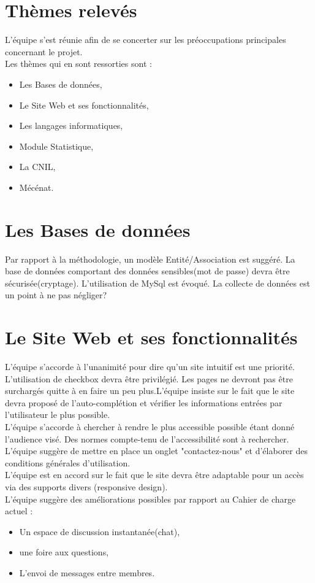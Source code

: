 \documentclass [a4paper] {article}
\begin{document}
\section{Thèmes relevés}
L'équipe s'est réunie afin de se concerter sur les préoccupations principales concernant le projet.
\\
Les thèmes qui en sont ressorties sont : 
\begin{itemize}
\item Les Bases de données,
\item Le Site Web et ses fonctionnalités,
\item Les langages informatiques,
\item Module Statistique,
\item La CNIL,
\item Mécénat.
\end{itemize}


\section{Les Bases de données}
Par rapport à la méthodologie, un modèle Entité/Association est suggéré.
La base de données comportant des données sensibles(mot de passe) devra être sécurisée(cryptage). L'utilisation de MySql est évoqué. La collecte de données est un point à ne pas négliger?


\section{Le Site Web et ses fonctionnalités}

L'équipe s'accorde à l'unanimité pour dire qu'un site intuitif est une priorité. L'utilisation de checkbox devra être privilégié. Les pages ne devront pas être surchargés quitte à en faire un peu plus.L'équipe insiste sur le fait que le site devra proposé de l'auto-complétion  et vérifier les informations entrées par l'utilisateur le plus possible.\\
L'équipe s'accorde à chercher à rendre le plus accessible possible étant donné l'audience visé. Des normes compte-tenu de l'accessibilité sont à rechercher. L'équipe suggère de mettre en place un onglet "contactez-nous" et d'élaborer des conditions générales d'utilisation.\\
L'équipe est en accord sur le fait que le site devra être adaptable pour un accès via des supports divers (responsive design).
\\

L'équipe suggère des améliorations possibles par rapport au Cahier de charge actuel : 
\begin{itemize}
\item Un espace de discussion instantanée(chat),
\item une foire aux questions,
\item L'envoi de messages entre membres.
\end{itemize}
\end{document}
